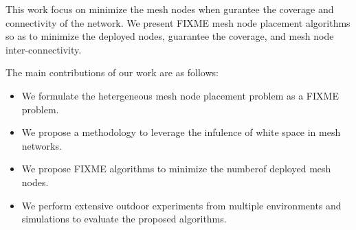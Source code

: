 This work focus on minimize the mesh nodes when gurantee the coverage and connectivity of the network.
We present FIXME mesh node placement algorithms so as to minimize the deployed nodes, guarantee the coverage, and mesh node inter-connectivity.


% 

% 
The main contributions of our work are as follows:
\begin{itemize}
\item We formulate the hetergeneous mesh node placement problem as a FIXME problem.  

\item We propose a methodology to leverage the infulence of white space in mesh networks.

\item We propose FIXME algorithms to minimize the numberof deployed mesh nodes.

\item We perform extensive outdoor experiments from multiple environments and simulations to evaluate the proposed algorithms.


\end{itemize}




